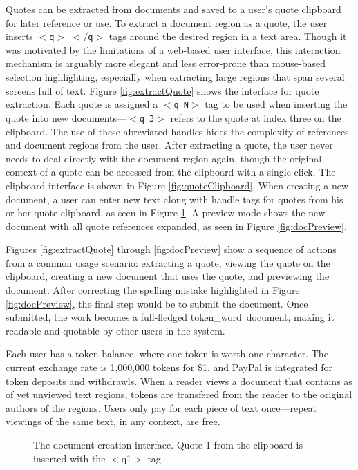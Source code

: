 \documentclass{acm_proc_article-sp}
\newcommand{\tokenWord}{token\_word}
\begin{document}
Quotes can be extracted from documents and saved to a user's quote clipboard for later reference or use.
To extract a document region as a quote, the user inserts $<$\texttt{q}$>$ $<$$/$\texttt{q}$>$ tags around the desired region in a text area.
Though it was motivated by the limitations of a web-based user interface, this interaction mechanism is arguably more elegant and less error-prone than mouse-based selection highlighting, especially when extracting large regions that span several screens full of text.
Figure \ref{fig:extractQuote} shows the interface for quote extraction. 
Each quote is assigned a $<$\texttt{q N}$>$ tag to be used when inserting the quote into new documents---$<$\texttt{q 3}$>$ refers to the quote at index three on the clipboard.
The use of these abreviated handles hides the complexity of references and document regions from the user.
After extracting a quote, the user never needs to deal directly with the document region again, though the original context of a quote can be accessed from the clipboard with a single click.
The clipboard interface is shown in Figure \ref{fig:quoteClipboard}.
When creating a new document, a user can enter new text along with handle tags for quotes from his or her quote clipboard, as seen in Figure \ref{fig:docCreate}.
A preview mode shows the new document with all quote references expanded, as seen in Figure \ref{fig:docPreview}.




Figures \ref{fig:extractQuote} through \ref{fig:docPreview} show a sequence of actions from a common usage scenario:  extracting a quote, viewing the quote on the clipboard, creating a new document that uses the quote, and previewing the document.
After correcting the spelling mistake highlighted in Figure \ref{fig:docPreview}, the final step would be to submit the document.
Once submitted, the work becomes a full-fledged \tokenWord \  document, making it readable and quotable by other users in the system.


Each user has a token balance, where one token is worth one character.
The current exchange rate is 1,000,000 tokens for \$1, and PayPal is integrated for token deposits and withdrawls.
When a reader views a document that contains as of yet unviewed text regions, tokens are transfered from the reader to the original authors of the regions.
Users only pay for each piece of text once---repeat viewings of the same text, in any context, are free.
\begin{figure}[t]
\centering
{}
\caption{The document creation interface. Quote 1 from the clipboard is inserted with the $<$q1$>$ tag.}
\label{fig:docCreate}
\end{figure}
\end{document}
